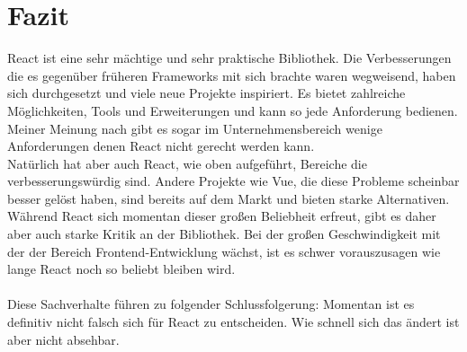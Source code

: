 \section{Fazit}
React ist eine sehr mächtige und sehr praktische Bibliothek. Die Verbesserungen die es gegenüber früheren Frameworks mit sich brachte waren wegweisend, haben sich durchgesetzt und viele neue Projekte inspiriert. Es bietet zahlreiche Möglichkeiten, Tools und Erweiterungen und kann so jede Anforderung bedienen. Meiner Meinung nach gibt es sogar im Unternehmensbereich wenige Anforderungen denen React nicht gerecht werden kann. \\
Natürlich hat aber auch React, wie oben aufgeführt, Bereiche die verbesserungswürdig sind. Andere Projekte wie Vue, die diese Probleme scheinbar besser gelöst haben, sind bereits auf dem Markt und bieten starke Alternativen. Während React sich momentan dieser großen Beliebheit erfreut, gibt es daher aber auch starke Kritik an der Bibliothek. Bei der großen Geschwindigkeit mit der der Bereich Frontend-Entwicklung wächst, ist es schwer vorauszusagen wie lange React noch so beliebt bleiben wird. \\\\
Diese Sachverhalte führen zu folgender Schlussfolgerung: Momentan ist es definitiv nicht falsch sich für React zu entscheiden. Wie schnell sich das ändert ist aber nicht absehbar. 